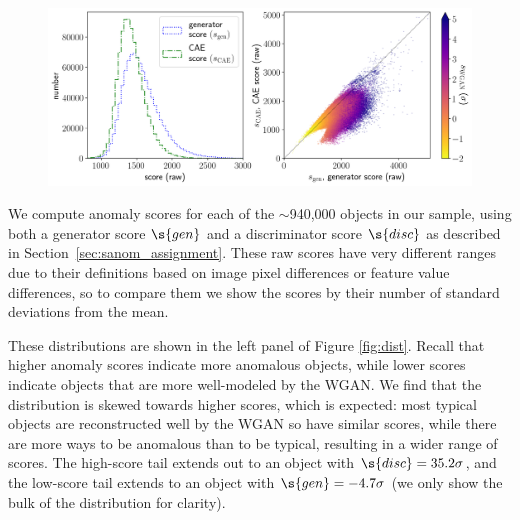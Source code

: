 \begin{figure}
    \centering
    \includegraphics[width=\textwidth]{score_distribution_ae}
    \caption{}
    \label{fig:dist_ae}
\end{figure}

We compute anomaly scores for each of the $\sim$940,000 objects in our sample, using both a generator score $\s{gen}$ and a discriminator score $\s{disc}$ as described in Section~\ref{sec:sanom_assignment}.
These raw scores have very different ranges due to their definitions based on image pixel differences or feature value differences, so to compare them we show the scores by their number of standard deviations from the mean. 

These distributions are shown in the left panel of Figure \ref{fig:dist}.
Recall that higher anomaly scores indicate more anomalous objects, while lower scores indicate objects that are more well-modeled by the WGAN.
We find that the distribution is skewed towards higher scores, which is expected: most typical objects are reconstructed well by the WGAN so have similar scores, while there are more ways to be anomalous than to be typical, resulting in a wider range of scores.
The high-score tail extends out to an object with $\s{disc}=35.2\sigma$, and the low-score tail extends to an object with $\s{gen}=-4.7\sigma$ (we only show the bulk of the distribution for clarity).

